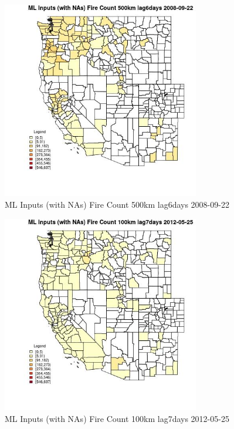 \begin{figure} 
\centering  
\includegraphics[width=0.77\textwidth]{Code_Outputs/Report_ML_input_PM25_Step4_part_e_de_duplicated_aves_compiled_2019-05-18wNAs_CountyFire_Count_500km_lag6daysMean2008-09-22.jpg} 
\caption{\label{fig:Report_ML_input_PM25_Step4_part_e_de_duplicated_aves_compiled_2019-05-18wNAsCountyFire_Count_500km_lag6daysMean2008-09-22}ML Inputs (with NAs) Fire Count 500km lag6days 2008-09-22} 
\end{figure} 
 

\clearpage 

\begin{figure} 
\centering  
\includegraphics[width=0.77\textwidth]{Code_Outputs/Report_ML_input_PM25_Step4_part_e_de_duplicated_aves_compiled_2019-05-18wNAs_CountyFire_Count_100km_lag7daysMean2012-05-25.jpg} 
\caption{\label{fig:Report_ML_input_PM25_Step4_part_e_de_duplicated_aves_compiled_2019-05-18wNAsCountyFire_Count_100km_lag7daysMean2012-05-25}ML Inputs (with NAs) Fire Count 100km lag7days 2012-05-25} 
\end{figure} 
 

